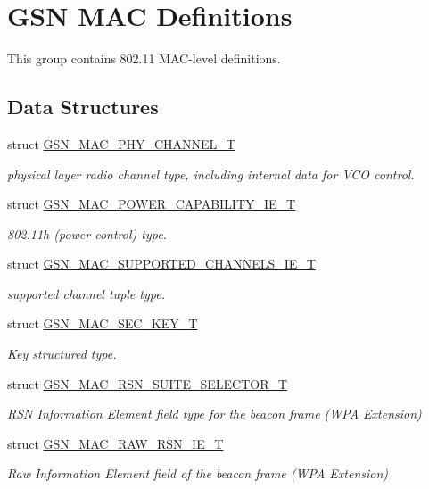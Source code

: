 \hypertarget{a00642}{
\section{GSN MAC Definitions}
\label{a00642}
}


This group contains 802.11 MAC-\/level definitions.  


\subsection*{Data Structures}
\begin{DoxyCompactItemize}
\item 
struct \hyperlink{a00118}{GSN\_\-MAC\_\-PHY\_\-CHANNEL\_\-T}
\begin{DoxyCompactList}\small\item\em physical layer radio channel type, including internal data for VCO control. \end{DoxyCompactList}\item 
struct \hyperlink{a00122}{GSN\_\-MAC\_\-POWER\_\-CAPABILITY\_\-IE\_\-T}
\begin{DoxyCompactList}\small\item\em 802.11h (power control) type. \end{DoxyCompactList}\item 
struct \hyperlink{a00133}{GSN\_\-MAC\_\-SUPPORTED\_\-CHANNELS\_\-IE\_\-T}
\begin{DoxyCompactList}\small\item\em supported channel tuple type. \end{DoxyCompactList}\item 
struct \hyperlink{a00131}{GSN\_\-MAC\_\-SEC\_\-KEY\_\-T}
\begin{DoxyCompactList}\small\item\em Key structured type. \end{DoxyCompactList}\item 
struct \hyperlink{a00128}{GSN\_\-MAC\_\-RSN\_\-SUITE\_\-SELECTOR\_\-T}
\begin{DoxyCompactList}\small\item\em RSN Information Element field type for the beacon frame (WPA Extension) \end{DoxyCompactList}\item 
struct \hyperlink{a00126}{GSN\_\-MAC\_\-RAW\_\-RSN\_\-IE\_\-T}
\begin{DoxyCompactList}\small\item\em Raw Information Element field of the beacon frame (WPA Extension) \end{DoxyCompactList}\item 

\end{DoxyCompactItemize}
